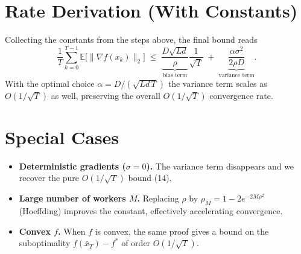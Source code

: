 \documentclass{article}
\newcommand{\E}{\mathbb{E}}
\begin{document}
\section*{Rate Derivation (With Constants)}
Collecting the constants from the steps above, the final bound reads
\[
\boxed{
\frac{1}{T}\sum_{k=0}^{T-1}\E\!\bigl[\|\nabla f(x_k)\|_{2}\bigr]
\;\le\;
\underbrace{\frac{D\sqrt{L d}}{\rho}}_{\text{bias term}}\frac{1}{\sqrt{T}}
\;+\;
\underbrace{\frac{\alpha\sigma^{2}}{2\rho D}}_{\text{variance term}} .
}
\]
With the optimal choice $\alpha = D/(\sqrt{L d\,T})$ the variance term scales as $O(1/\sqrt{T})$ as well, preserving the overall $O(1/\sqrt{T})$ convergence rate.

\section*{Special Cases}
\begin{itemize}
\item \textbf{Deterministic gradients ($\sigma=0$).}  The variance term disappears and we recover the pure $O(1/\sqrt{T})$ bound (14).
\item \textbf{Large number of workers $M$.}  Replacing $\rho$ by $\rho_M=1-2e^{-2M\rho^{2}}$ (Hoeffding) improves the constant, effectively accelerating convergence.
\item \textbf{Convex $f$.}  When $f$ is convex, the same proof gives a bound on the suboptimality $f(\bar x_T)-f^{*}$ of order $O(1/\sqrt{T})$.
\end{itemize}
\end{document}
